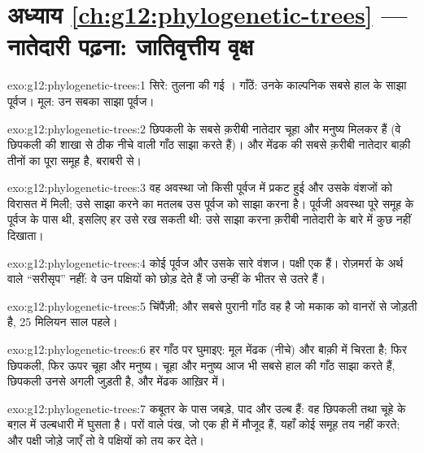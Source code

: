 \section*{अध्याय \ref{ch:g12:phylogenetic-trees} --- नातेदारी पढ़ना: जातिवृत्तीय वृक्ष}

\begin{solution}{exo:g12:phylogenetic-trees:1}
सिरे: तुलना की गई । गाँठें: उनके काल्पनिक सबसे हाल के साझा पूर्वज।
मूल: उन सबका साझा पूर्वज।
\end{solution}

\begin{solution}{exo:g12:phylogenetic-trees:2}
छिपकली के सबसे क़रीबी नातेदार चूहा और मनुष्य मिलकर हैं (वे छिपकली की शाखा से
ठीक नीचे वाली गाँठ साझा करते हैं)। और मेंढक की सबसे क़रीबी नातेदार बाक़ी
तीनों का पूरा समूह है, बराबरी से।
\end{solution}

\begin{solution}{exo:g12:phylogenetic-trees:3}
वह अवस्था जो किसी पूर्वज में प्रकट हुई और उसके वंशजों को विरासत में मिली;
उसे साझा करने का मतलब उस पूर्वज को साझा करना है। पूर्वजी अवस्था पूरे समूह
के पूर्वज के पास थी, इसलिए हर  उसे रख सकती थी: उसे साझा करना क़रीबी
नातेदारी के बारे में कुछ नहीं दिखाता।
\end{solution}

\begin{solution}{exo:g12:phylogenetic-trees:4}
कोई पूर्वज और उसके सारे वंशज। पक्षी एक  हैं। रोज़मर्रा के अर्थ वाले
``सरीसृप'' नहीं: वे उन पक्षियों को छोड़ देते हैं जो उन्हीं के भीतर से उतरे
हैं।
\end{solution}

\begin{solution}{exo:g12:phylogenetic-trees:5}
चिंपैंज़ी; और सबसे पुरानी गाँठ वह है जो मकाक को वानरों से जोड़ती है, 25
मिलियन साल पहले।
\end{solution}

\begin{solution}{exo:g12:phylogenetic-trees:6}
हर गाँठ पर घुमाइए: मूल मेंढक (नीचे) और बाक़ी में चिरता है; फिर छिपकली, फिर
ऊपर चूहा और मनुष्य। चूहा और मनुष्य आज भी सबसे हाल की गाँठ साझा करते हैं,
छिपकली उनसे अगली जुड़ती है, और मेंढक आख़िर में।
\end{solution}

\begin{solution}{exo:g12:phylogenetic-trees:7}
कबूतर के पास जबड़े, पाद और उल्ब हैं: वह छिपकली तथा चूहे के बग़ल में
उल्बधारी  में घुसता है। परों वाले पंख, जो एक ही  में मौजूद हैं,
यहाँ कोई समूह तय नहीं करते; और पक्षी जोड़े जाएँ तो वे पक्षियों को तय कर
देते।
\end{solution}

